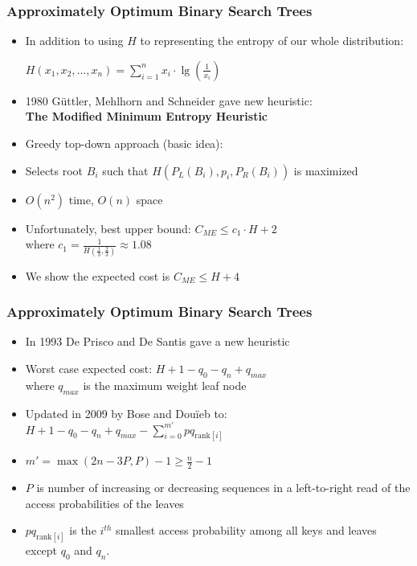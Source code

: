 \documentclass{beamer}
\theoremstyle{plain}
\begin{document}
\begin{frame} \frametitle{Approximately Optimum Binary Search Trees}

\begin{itemize}

\item In addition to using $H$ to representing the entropy of our whole distribution:
\begin{center}
$H(x_1,x_2,...,x_n) = \sum_{i=1}^{n} x_i\cdot\lg(\frac{1}{x_i})$
\end{center}

\item 1980 G{\"u}ttler, Mehlhorn and Schneider gave new heuristic: \\
\textbf{The Modified Minimum Entropy Heuristic}

\item Greedy top-down approach (basic idea):

\item Selects root $B_i$ such that $H(P_L(B_i), p_i, P_R(B_i))$ is maximized

\item $O(n^2)$ time, $O(n)$ space

\item Unfortunately, best upper bound: $C_{ME} \leq c_1\cdot H+2$ \\ where $c_1=\frac{1}{H(\frac{1}{3}, \frac{2}{3})} \approx 1.08$ 

\item We show the expected cost is $C_{ME} \leq H+4$


\end{itemize}

\end{frame}

\begin{frame} \frametitle{Approximately Optimum Binary Search Trees}

\begin{itemize}
\item In 1993 De Prisco and De Santis gave a new heuristic \cite{de1993binary}

\item Worst case expected cost: $H+1-q_0-q_n+q_{max}$ \\
 where $q_{max}$ is the maximum weight leaf node

\item Updated in 2009 by Bose and Dou\"{i}eb to: \\
$H + 1 - q_0 - q_n + q_{max} - \sum_{i=0}^{m'} pq_{\text{rank}[i]}$

\item $m'=\max({2n-3P,P})-1 \geq \frac{n}{2} - 1$ 

\item $P$ is number of increasing or decreasing sequences in a left-to-right read of the access probabilities of the leaves

\item $pq_{\text{rank}[i]}$ is the $i^{th}$ smallest access probability among all keys and leaves except $q_0$ and $q_n$.


\end{itemize}

\end{frame}
\end{document}
